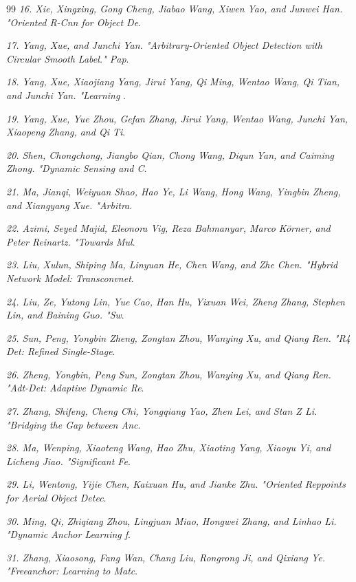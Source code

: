 \documentclass[10pt,twocolumn,final]{article}
\begin{document}
\begin{thebibliography}{99}
\textit{16.	Xie, Xingxing, Gong Cheng, Jiabao Wang, Xiwen Yao, and Junwei Han. "Oriented R-Cnn for Object De}.

\textit{17.	Yang, Xue, and Junchi Yan. "Arbitrary-Oriented Object Detection with Circular Smooth Label." Pap}.

\textit{18.	Yang, Xue, Xiaojiang Yang, Jirui Yang, Qi Ming, Wentao Wang, Qi Tian, and Junchi Yan. "Learning }.

\textit{19.	Yang, Xue, Yue Zhou, Gefan Zhang, Jirui Yang, Wentao Wang, Junchi Yan, Xiaopeng Zhang, and Qi Ti}.

\textit{20.	Shen, Chongchong, Jiangbo Qian, Chong Wang, Diqun Yan, and Caiming Zhong. "Dynamic Sensing and C}.

\textit{21.	Ma, Jianqi, Weiyuan Shao, Hao Ye, Li Wang, Hong Wang, Yingbin Zheng, and Xiangyang Xue. "Arbitra}.

\textit{22.	Azimi, Seyed Majid, Eleonora Vig, Reza Bahmanyar, Marco Körner, and Peter Reinartz. "Towards Mul}.

\textit{23.	Liu, Xulun, Shiping Ma, Linyuan He, Chen Wang, and Zhe Chen. "Hybrid Network Model: Transconvnet}.

\textit{24.	Liu, Ze, Yutong Lin, Yue Cao, Han Hu, Yixuan Wei, Zheng Zhang, Stephen Lin, and Baining Guo. "Sw}.

\textit{25.	Sun, Peng, Yongbin Zheng, Zongtan Zhou, Wanying Xu, and Qiang Ren. "R4 Det: Refined Single-Stage}.

\textit{26.	Zheng, Yongbin, Peng Sun, Zongtan Zhou, Wanying Xu, and Qiang Ren. "Adt-Det: Adaptive Dynamic Re}.

\textit{27.	Zhang, Shifeng, Cheng Chi, Yongqiang Yao, Zhen Lei, and Stan Z Li. "Bridging the Gap between Anc}.

\textit{28.	Ma, Wenping, Xiaoteng Wang, Hao Zhu, Xiaoting Yang, Xiaoyu Yi, and Licheng Jiao. "Significant Fe}.

\textit{29.	Li, Wentong, Yijie Chen, Kaixuan Hu, and Jianke Zhu. "Oriented Reppoints for Aerial Object Detec}.

\textit{30.	Ming, Qi, Zhiqiang Zhou, Lingjuan Miao, Hongwei Zhang, and Linhao Li. "Dynamic Anchor Learning f}.

\textit{31.	Zhang, Xiaosong, Fang Wan, Chang Liu, Rongrong Ji, and Qixiang Ye. "Freeanchor: Learning to Matc}.


\end{thebibliography}
\end{document}
